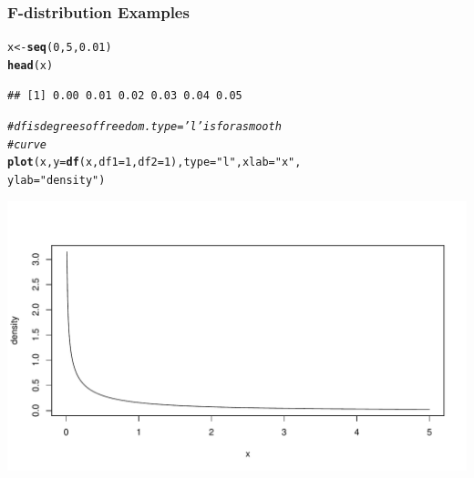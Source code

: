 \documentclass[oneside]{book}\usepackage[]{graphicx}\usepackage[dvipsnames,table,xcdraw]{xcolor}
\makeatletter
\def\maxwidth{ %
  \ifdim\Gin@nat@width>\linewidth
    \linewidth
  \else
    \Gin@nat@width
  \fi
}
\newcommand{\hlnum}[1]{\textcolor[rgb]{0.686,0.059,0.569}{#1}}%
\newcommand{\hlstr}[1]{\textcolor[rgb]{0.192,0.494,0.8}{#1}}%
\newcommand{\hlcom}[1]{\textcolor[rgb]{0.678,0.584,0.686}{\textit{#1}}}%
\newcommand{\hlstd}[1]{\textcolor[rgb]{0.345,0.345,0.345}{#1}}%
\newcommand{\hlkwb}[1]{\textcolor[rgb]{0.69,0.353,0.396}{#1}}%
\newcommand{\hlkwc}[1]{\textcolor[rgb]{0.333,0.667,0.333}{#1}}%
\newcommand{\hlkwd}[1]{\textcolor[rgb]{0.737,0.353,0.396}{\textbf{#1}}}%
\newenvironment{kframe}{%
 \def\at@end@of@kframe{}%
 \ifinner\ifhmode%
  \def\at@end@of@kframe{\end{minipage}}%
  \begin{minipage}{\columnwidth}%
 \fi\fi%
 \def\FrameCommand##1{\hskip\@totalleftmargin \hskip-\fboxsep
 \colorbox{shadecolor}{##1}\hskip-\fboxsep
     \hskip-\linewidth \hskip-\@totalleftmargin \hskip\columnwidth}%
 \MakeFramed {\advance\hsize-\width
   \@totalleftmargin\z@ \linewidth\hsize
   \@setminipage}}%
 {\par\unskip\endMakeFramed%
 \at@end@of@kframe}
\newenvironment{knitrout}{}{} %
\makeatother
\begin{document}
\subsubsection{F-distribution Examples}

\begin{knitrout}
\color{fgcolor}\begin{kframe}
\begin{alltt}
\hlstd{x} \hlkwb{<-} \hlkwd{seq}\hlstd{(}\hlnum{0}\hlstd{,} \hlnum{5}\hlstd{,} \hlnum{0.01}\hlstd{)}
\hlkwd{head}\hlstd{(x)}
\end{alltt}
\begin{verbatim}
## [1] 0.00 0.01 0.02 0.03 0.04 0.05
\end{verbatim}
\begin{alltt}
\hlcom{# df is degrees of freedom.  type = 'l' is for a smooth}
\hlcom{# curve}
\hlkwd{plot}\hlstd{(x,} \hlkwc{y} \hlstd{=} \hlkwd{df}\hlstd{(x,} \hlkwc{df1} \hlstd{=} \hlnum{1}\hlstd{,} \hlkwc{df2} \hlstd{=} \hlnum{1}\hlstd{),} \hlkwc{type} \hlstd{=} \hlstr{"l"}\hlstd{,} \hlkwc{xlab} \hlstd{=} \hlstr{"x"}\hlstd{,}
  \hlkwc{ylab} \hlstd{=} \hlstr{"density"}\hlstd{)}
\end{alltt}
\end{kframe}

{\centering \includegraphics[width=\maxwidth]{figure/unnamed-chunk-34-1} 

}



\end{knitrout}
\end{document}
